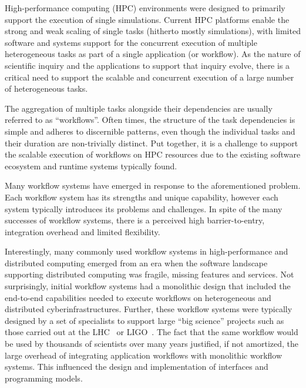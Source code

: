 
High-performance computing (HPC) environments were designed to primarily support
the execution of single simulations. Current HPC platforms enable
the strong and weak scaling of single tasks (hitherto mostly simulations),
with limited software and systems support for the concurrent execution of
multiple heterogeneous tasks as part of a single application (or workflow). As
the nature of scientific inquiry and the applications to support that inquiry
evolve, there is a critical need to support the scalable and concurrent
execution of a large number of heterogeneous tasks.


The aggregation of multiple tasks alongside their dependencies are usually
referred to as ``workflows''. Often times, the structure of the task
dependencies is simple and adheres to discernible patterns, even though the
individual tasks and their duration are non-trivially distinct. Put together,
it is a challenge to support the scalable execution of workflows on HPC
resources due to the existing software ecosystem and runtime systems
typically found.

Many workflow systems have emerged in response to the
aforementioned problem. Each workflow system has its strengths and unique
capability, however each system typically introduces its problems
and challenges. In spite of the many successes of workflow systems, there is
a perceived high barrier-to-entry, integration overhead and limited
flexibility.

Interestingly, many commonly used workflow systems in high-performance and
distributed computing emerged from an era when the software landscape
supporting distributed computing was fragile, missing features and services.
Not surprisingly, initial workflow systems had a monolithic design that
included the end-to-end capabilities needed to execute workflows on
heterogeneous and distributed cyberinfrastructures. Further, these workflow
systems were typically designed by a set of specialists to support large
``big science'' projects such as those carried out at the
LHC~\cite{breskin2009cern} or LIGO~\cite{althouse1992ligo}. The fact that the
same workflow would be used by thousands of scientists over many years
justified, if not amortized, the large overhead of integrating application
workflows with monolithic workflow systems. This influenced the design and
implementation of %
interfaces and programming models.

